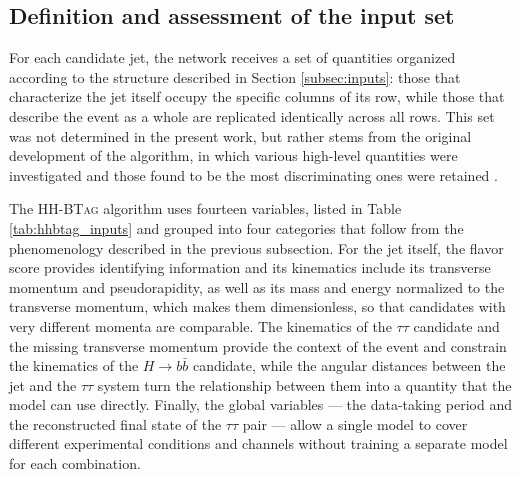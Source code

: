 \subsection{Definition and assessment of the input set}
\label{subsec:hhbtag_inupts}
%
For each candidate jet, the network receives a set of quantities organized according to the structure described in Section \ref{subsec:inputs}: those that characterize the jet itself occupy the specific columns of its row, while those that describe the event as a whole are replicated identically across all rows. This set was not determined in the present work, but rather stems from the original development of the algorithm, in which various high-level quantities were investigated and those found to be the most discriminating ones were retained \cite{HHBTag}.\medskip

The \textsc{HH-BTag} algorithm uses fourteen variables, listed in Table \ref{tab:hhbtag_inputs} and grouped into four categories that follow from the phenomenology described in the previous subsection. For the jet itself, the flavor score provides identifying information and its kinematics include its transverse momentum and pseudorapidity, as well as its mass and energy normalized to the transverse momentum, which makes them dimensionless, so that candidates with very different momenta are comparable. The kinematics of the $\tau\tau$ candidate and the missing transverse momentum provide the context of the event and constrain the kinematics of the $H\rightarrow b\bar{b}$ candidate, while the angular distances between the jet and the $\tau\tau$ system turn the relationship between them into a quantity that the model can use directly. Finally, the global variables — the data-taking period and the reconstructed final state of the $\tau\tau$ pair — allow a single model to cover different experimental conditions and channels without training a separate model for each combination.

